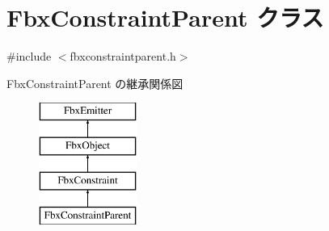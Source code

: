 \hypertarget{class_fbx_constraint_parent}{}\section{Fbx\+Constraint\+Parent クラス}
\label{class_fbx_constraint_parent}


{\ttfamily \#include $<$fbxconstraintparent.\+h$>$}

Fbx\+Constraint\+Parent の継承関係図\begin{figure}[H]
\begin{center}
\leavevmode
\includegraphics[height=4.000000cm]{class_fbx_constraint_parent}
\end{center}
\end{figure}
